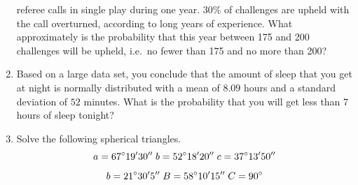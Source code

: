 \documentclass[11pt]{article}
\begin{document}
\begin{enumerate}
  referee calls in single play during one year. 30\% of challenges are
  upheld with the call overturned, according to long years of
  experience. What approximately is the probability that this year
  between 175 and 200 challenges will be upheld, i.e.\ no fewer than
  175 and no more than 200?
\item Based on a large data set, you conclude that the amount of sleep
   that you get at night is normally distributed with a mean of $8.09$ hours
   and a standard deviation of $52$ minutes. What is the probability
   that you will get less than 7 hours of sleep tonight?
 \item Solve the following spherical triangles.
   \begin{equation}
     \label{eq:isotufie}
     a=67^{\circ}19'30''\;{}b=52^{\circ}18'20''\;{}c=37^{\circ}13'50''\notag
   \end{equation}
   \begin{equation}
     \label{eq:eizokaih}
     b=21^{\circ}30'5''\;{}B=58^{\circ}10'15''\;{}C=90^{\circ}\notag
   \end{equation}
\end{enumerate}
\end{document}
